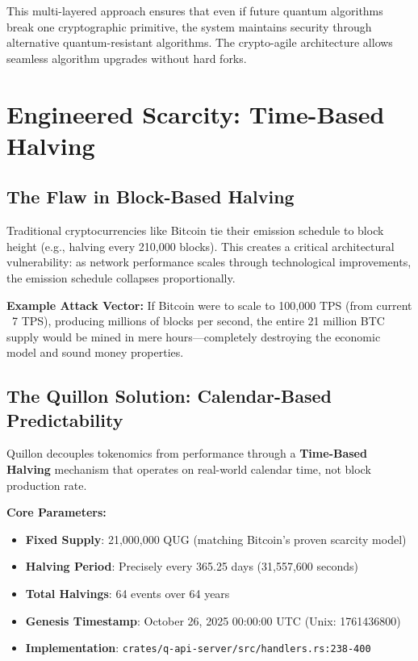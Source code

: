 \documentclass[11pt,a4paper]{scrartcl}
\begin{document}
This multi-layered approach ensures that even if future quantum algorithms break one cryptographic primitive, the system maintains security through alternative quantum-resistant algorithms. The crypto-agile architecture allows seamless algorithm upgrades without hard forks.

\newpage

\section{Engineered Scarcity: Time-Based Halving}

\subsection{The Flaw in Block-Based Halving}

Traditional cryptocurrencies like Bitcoin tie their emission schedule to block height (e.g., halving every 210,000 blocks). This creates a critical architectural vulnerability: as network performance scales through technological improvements, the emission schedule collapses proportionally.

\textbf{Example Attack Vector:}
If Bitcoin were to scale to 100,000 TPS (from current ~7 TPS), producing millions of blocks per second, the entire 21 million BTC supply would be mined in mere hours—completely destroying the economic model and sound money properties.

\subsection{The Quillon Solution: Calendar-Based Predictability}

Quillon decouples tokenomics from performance through a \textbf{Time-Based Halving} mechanism that operates on real-world calendar time, not block production rate.

\textbf{Core Parameters:}
\begin{itemize}
\item \textbf{Fixed Supply}: 21,000,000 QUG (matching Bitcoin's proven scarcity model)
\item \textbf{Halving Period}: Precisely every 365.25 days (31,557,600 seconds)
\item \textbf{Total Halvings}: 64 events over 64 years
\item \textbf{Genesis Timestamp}: October 26, 2025 00:00:00 UTC (Unix: 1761436800)
\item \textbf{Implementation}: \texttt{crates/q-api-server/src/handlers.rs:238-400}
\end{itemize}
\end{document}
